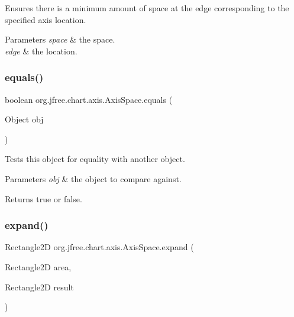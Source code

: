 Ensures there is a minimum amount of space at the edge corresponding to the specified axis location.


\begin{DoxyParams}{Parameters}
{\em space} & the space. \\
\hline
{\em edge} & the location. \\
\hline
\end{DoxyParams}
\mbox{\label{classorg_1_1jfree_1_1chart_1_1axis_1_1_axis_space_a27a78e96723f5aa5ef605a3f8eb03887}} 
\subsubsection{\texorpdfstring{equals()}{equals()}}
{\footnotesize\ttfamily boolean org.\+jfree.\+chart.\+axis.\+Axis\+Space.\+equals (\begin{DoxyParamCaption}\item[{Object}]{obj }\end{DoxyParamCaption})}

Tests this object for equality with another object.


\begin{DoxyParams}{Parameters}
{\em obj} & the object to compare against.\\
\hline
\end{DoxyParams}
\begin{DoxyReturn}{Returns}
{\ttfamily true} or {\ttfamily false}. 
\end{DoxyReturn}
\mbox{\label{classorg_1_1jfree_1_1chart_1_1axis_1_1_axis_space_a8270ee0c288a0b29e3997d4c404fb533}} 
\subsubsection{\texorpdfstring{expand()}{expand()}}
{\footnotesize\ttfamily Rectangle2D org.\+jfree.\+chart.\+axis.\+Axis\+Space.\+expand (\begin{DoxyParamCaption}\item[{Rectangle2D}]{area,  }\item[{Rectangle2D}]{result }\end{DoxyParamCaption})}

